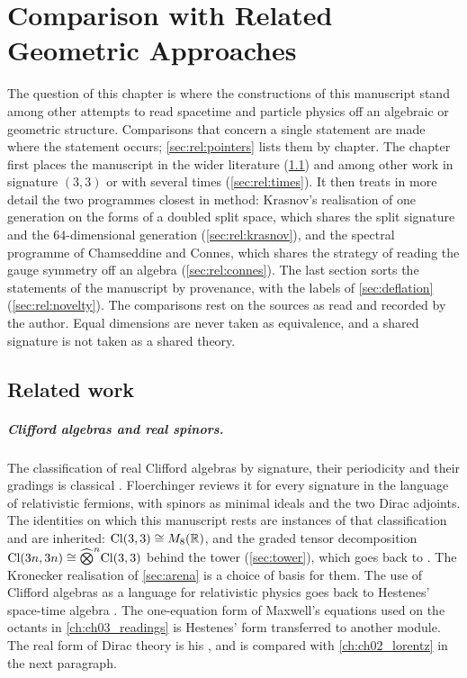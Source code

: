 \chapter{Comparison with Related Geometric Approaches}
\label{ch:ch14_related}

The question of this chapter is where the constructions of this manuscript stand among other attempts to read spacetime and particle
physics off an algebraic or geometric structure. Comparisons that concern a single statement are made where the statement occurs;
\cref{sec:rel:pointers} lists them by chapter. The chapter first places the manuscript in the wider literature (\cref{sec:rel:work}) and
among other work in signature $(3,3)$ or with several times (\cref{sec:rel:times}). It then treats in more detail the two programmes
closest in method: Krasnov's realisation of one generation on the forms of a doubled split space, which shares the split signature and the
$64$-dimensional generation (\cref{sec:rel:krasnov}), and the spectral programme of Chamseddine and Connes, which shares the strategy of
reading the gauge symmetry off an algebra (\cref{sec:rel:connes}). The last section sorts the statements of the manuscript by provenance,
with the labels of \cref{sec:deflation} (\cref{sec:rel:novelty}). The comparisons rest on the sources as read and recorded by the author.
Equal dimensions are never taken as equivalence, and a shared signature is not taken as a shared theory.

\section{Related work}
\label{sec:rel:work}

\paragraph{Clifford algebras and real spinors.} The classification of real Clifford algebras by signature, their periodicity and their
gradings is classical \cite{AtiyahBottShapiro64,LawsonMichelsohn,Lounesto,Porteous}. Floerchinger \cite{Floerchinger21} reviews it for every
signature in the language of relativistic fermions, with spinors as minimal ideals and the two Dirac adjoints. The identities on which this
manuscript rests are instances of that classification and are inherited: $\mathrm{Cl}(3,3)\cong M_8(\mathbb{R})$, and the graded tensor decomposition
$\mathrm{Cl}(3n,3n)\cong\widehat\bigotimes^n\mathrm{Cl}(3,3)$ behind the tower (\cref{sec:tower}), which goes back to \cite{AtiyahBottShapiro64}. The
Kronecker realisation of \cref{sec:arena} is a choice of basis for them. The use of Clifford algebras as a language for relativistic physics
goes back to Hestenes' space-time algebra \cite{Hestenes66}. The one-equation form of Maxwell's equations used on the octants in
\cref{ch:ch03_readings} is Hestenes' form transferred to another module. The real form of Dirac theory is his \cite{Hestenes67}, and is
compared with \cref{ch:ch02_lorentz} in the next paragraph.

